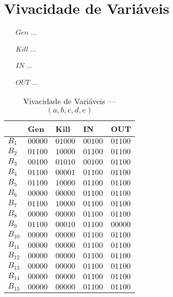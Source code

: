 \section{Vivacidade de Vari\'aveis}

\begin{itemize}
  \item[$Gen$] ...
  \item[$Kill$] ...
  \item[$IN$] ...
  \item[$OUT$] ...
\end{itemize}



\begin{table}[ht]
\centering
\begin{tabular}{l|l|l|l|l}
	& Gen & Kill & IN & OUT\\
\hline
$B_{1}$ &  $00000$ & $01000$ & $00100$ & $01100$\\
$B_{2}$ &  $01100$ & $10000$ & $01100$ & $01100$\\
$B_{3}$ &  $00100$ & $01010$ & $00100$ & $01100$\\
$B_{4}$ &  $01100$ & $00001$ & $01100$ & $01100$\\
$B_{5}$ &  $01100$ & $10000$ & $01100$ & $01100$\\
$B_{6}$ &  $00000$ & $00000$ & $01100$ & $01100$\\
$B_{7}$ &  $01100$ & $10000$ & $01100$ & $01100$\\
$B_{8}$ &  $00000$ & $00000$ & $01100$ & $01100$\\
$B_{9}$ &  $01100$ & $00010$ & $01100$ & $00000$\\
$B_{10}$ &  $00000$ & $00000$ & $01100$ & $01100$\\
$B_{11}$ &  $00000$ & $00000$ & $01100$ & $01100$\\
$B_{12}$ &  $00000$ & $00000$ & $01100$ & $01100$\\
$B_{13}$ &  $00000$ & $00000$ & $01100$ & $01100$\\
$B_{14}$ &  $00000$ & $00000$ & $01100$ & $01100$\\
$B_{15}$ &  $00000$ & $00000$ & $01100$ & $01100$\\
\end{tabular}
\caption{Vivacidade de Vari\'aveis --- $(a, b, c, d, e)$}
\end{table}

